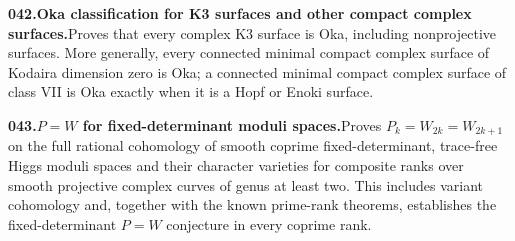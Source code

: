 \documentclass[11pt,a4paper]{article}
\begin{document}
  \par \begin{minipage}{\linewidth}
  \fontsize{10.5}{12.6}\selectfont\RaggedRight
  \hypertarget{result 042}{}
  {\bfseries\textcolor{muted}{042.}\enspace Oka classification for K3 surfaces and other compact complex surfaces.}\enspace Proves that every complex K3 surface is Oka, including nonprojective surfaces. More generally, every connected minimal compact complex surface of Kodaira dimension zero is Oka; a connected minimal compact complex surface of class VII is Oka exactly when it is a Hopf or Enoki surface.\par
  \end{minipage}\par\vspace{5pt}



  \par \begin{minipage}{\linewidth}
  \fontsize{10.5}{12.6}\selectfont\RaggedRight
  \hypertarget{result 043}{}
  {\bfseries\textcolor{muted}{043.}\enspace $P=W$ for fixed-determinant moduli spaces.}\enspace Proves $P_k=W_{2k}=W_{2k+1}$ on the full rational cohomology of smooth coprime fixed-determinant, trace-free Higgs moduli spaces and their character varieties for composite ranks over smooth projective complex curves of genus at least two. This includes variant cohomology and, together with the known prime-rank theorems, establishes the fixed-determinant $P=W$ conjecture in every coprime rank.\par
  \end{minipage}\par\vspace{5pt}
\end{document}
